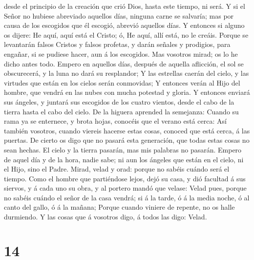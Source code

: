 desde el principio de la creación que crió Dios, hasta este tiempo, ni
será.  Y si el Señor no hubiese abreviado aquellos días,
ninguna carne se salvaría; mas por causa de los escogidos que él
escogió, abrevió aquellos días.  Y entonces si alguno os
dijere: He aquí, aquí está el Cristo; ó, He aquí, allí está, no le
creáis.  Porque se levantarán falsos Cristos y falsos
profetas, y darán señales y prodigios, para engañar, si se pudiese
hacer, aun á los escogidos.  Mas vosotros mirad; os lo he
dicho antes todo.  Empero en aquellos días, después de
aquella aflicción, el sol se obscurecerá, y la luna no dará su
resplandor;  Y las estrellas caerán del cielo, y las
virtudes que están en los cielos serán conmovidas;  Y
entonces verán al Hijo del hombre, que vendrá en las nubes con mucha
potestad y gloria.  Y entonces enviará sus ángeles, y
juntará sus escogidos de los cuatro vientos, desde el cabo de la tierra
hasta el cabo del cielo.  De la higuera aprended la
semejanza: Cuando su rama ya se enternece, y brota hojas, conocéis que
el verano está cerca:  Así también vosotros, cuando
viereis hacerse estas cosas, conoced que está cerca, á las puertas.
 De cierto os digo que no pasará esta generación, que
todas estas cosas no sean hechas.  El cielo y la tierra
pasarán, mas mis palabras no pasarán.  Empero de aquel
día y de la hora, nadie sabe; ni aun los ángeles que están en el cielo,
ni el Hijo, sino el Padre.  Mirad, velad y orad: porque
no sabéis cuándo será el tiempo.  Como el hombre que
partiéndose lejos, dejó su casa, y dió facultad á sus siervos, y á cada
uno su obra, y al portero mandó que velase:  Velad pues,
porque no sabéis cuándo el señor de la casa vendrá; si á la tarde, ó á
la media noche, ó al canto del gallo, ó á la mañana; 
Porque cuando viniere de repente, no os halle durmiendo. 
Y las cosas que á vosotros digo, á todos las digo: Velad.

\hypertarget{section-13}{%
\section{14}\label{section-13}}

